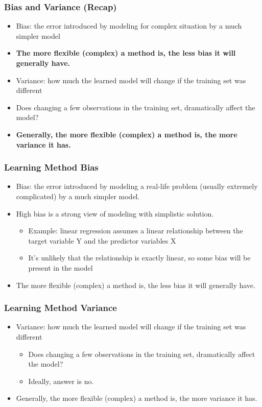 \begin{frame}[fragile]\frametitle{Bias and Variance (Recap)}
\begin{itemize}
\item Bias: the error introduced by modeling for complex situation by a much simpler model
\item {\bf The more flexible (complex) a method is, the less bias it will generally have.}
\item Variance: how much the learned model will change if the training set was different 
\item Does changing a few observations in the training set, dramatically affect the model?
\item {\bf Generally, the more flexible (complex) a method is, the more variance it has.}
\end{itemize}
\end{frame}


\begin{frame}[fragile]\frametitle{Learning Method Bias}
\begin{itemize}
\item Bias: the error introduced by modeling a real-life problem (usually extremely complicated) by a much simpler model.
\item High bias is a strong view of modeling with simplistic solution.

\begin{itemize}
\item Example: linear regression assumes a linear relationship between the target variable Y and the predictor variables X
\item It's unlikely that the relationship is exactly linear, so some bias will be present in the model
\end{itemize}
\item The more flexible (complex) a method is, the less bias it will generally have.

\end{itemize}
\end{frame}

\begin{frame}[fragile]\frametitle{Learning Method Variance}
\begin{itemize}
\item Variance: how much the learned model will change if the training set was different 
\begin{itemize}
\item Does changing a few observations in the training set, dramatically affect the model?
\item Ideally, answer is no.
\end{itemize}
\item Generally, the more flexible (complex) a method is, the more variance it has.
\end{itemize}
\end{frame}

